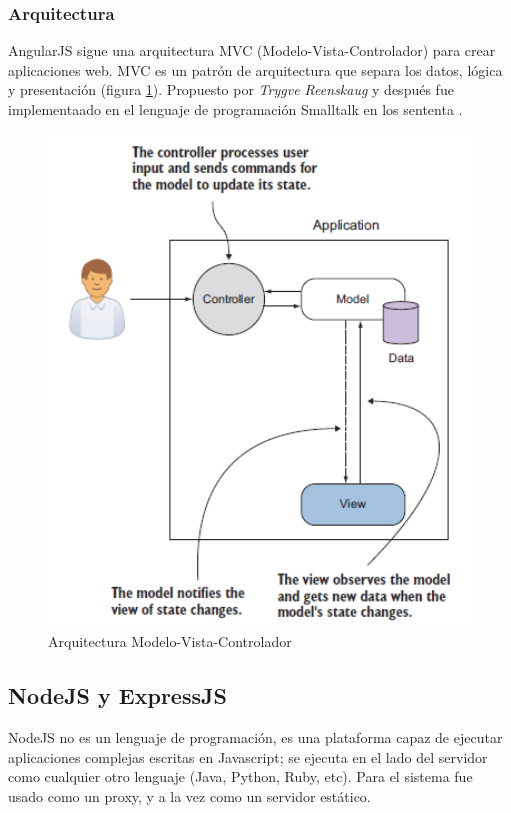		\subsubsection{Arquitectura}
			AngularJS sigue una arquitectura MVC (Modelo-Vista-Controlador) para crear
			aplicaciones web. MVC es un patrón de
			arquitectura que separa los datos, lógica y
			presentación (figura \ref{figure:mvc}). Propuesto por
			\textit{Trygve Reenskaug} y después fue implementaado en el lenguaje de
			programación Smalltalk en los sententa \cite{scott1spa}.
			
			\begin{figure}[H]
			    \centering
				\includegraphics[width=16cm]{../imgs/ejemplos/mvc.png}
				\caption{Arquitectura Modelo-Vista-Controlador}
				\label{figure:mvc}
			\end{figure}
			
		
	\subsection{NodeJS y ExpressJS}
		NodeJS no es un lenguaje de programación, es una plataforma capaz de ejecutar
		aplicaciones complejas escritas en Javascript; se ejecuta en el lado del
		servidor como cualquier otro lenguaje (Java, Python, Ruby, etc).
		Para el sistema fue usado como un proxy, y a la vez como un servidor estático.\\\
		
